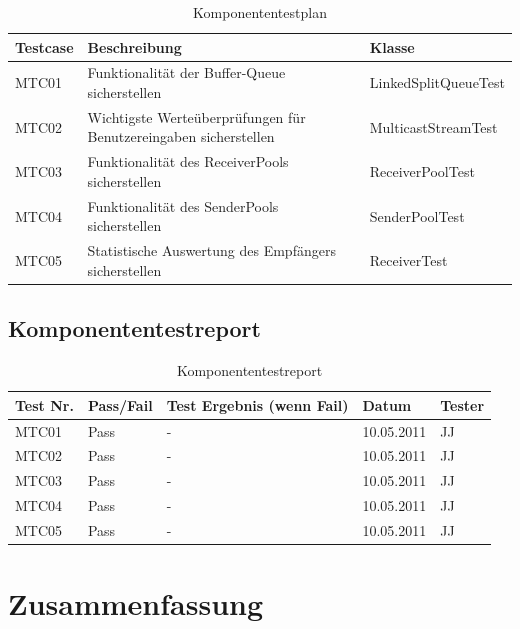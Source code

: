 \begin{table}[h]
\caption{Komponententestplan}
\label{tab:ktp}
\begin{center}
\begin{tabular}{|p{2cm}|p{5cm}|p{5cm}|}
\hline
\textbf{Testcase} & \textbf{Beschreibung} & \textbf{Klasse}\\
\hline
MTC01 & Funktionalität der Buffer-Queue sicherstellen & LinkedSplitQueueTest\\
\hline
MTC02 & Wichtigste Werteüberprüfungen für Benutzereingaben sicherstellen &
MulticastStreamTest \\
\hline
MTC03 & Funktionalität des ReceiverPools sicherstellen & ReceiverPoolTest\\
\hline
MTC04 & Funktionalität des SenderPools sicherstellen & SenderPoolTest \\
\hline
MTC05 & Statistische Auswertung des Empfängers sicherstellen & ReceiverTest \\
\hline
\end{tabular}
\end{center}
\end{table}

\section{Komponententestreport}

\begin{table}[h]
\caption{Komponententestreport}
\label{tab:ktr}
\begin{center}
\begin{tabular}{|p{2cm}|p{2cm}|p{6cm}|p{1.5cm}|p{1.5cm}|}
\hline
\textbf{Test Nr.} & \textbf{Pass/Fail} & \textbf{Test Ergebnis (wenn Fail)} & \textbf{Datum} & \textbf{Tester}\\
\hline
MTC01 & Pass & - & 10.05.2011 & JJ\\
\hline
MTC02 & Pass & - & 10.05.2011 & JJ\\
\hline
MTC03 & Pass & - & 10.05.2011 & JJ\\
\hline
MTC04 & Pass & - & 10.05.2011 & JJ\\
\hline
MTC05 & Pass & - & 10.05.2011 & JJ\\
\hline
\end{tabular}
\end{center}
\end{table}

\chapter{Zusammenfassung}


